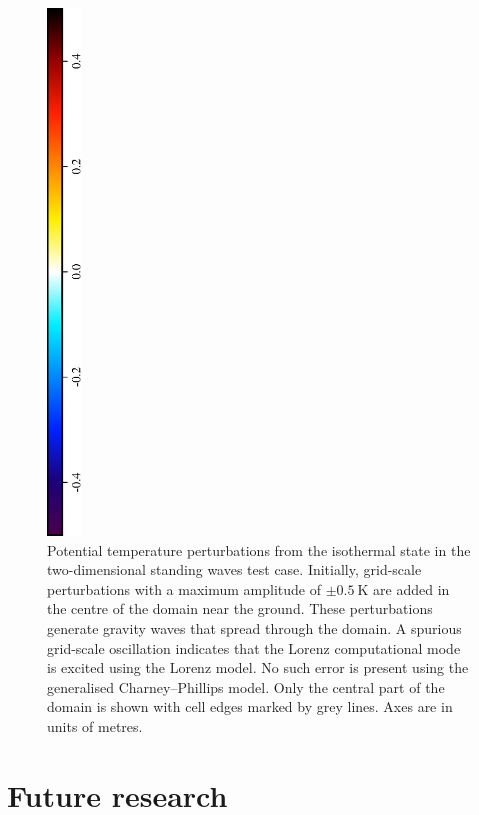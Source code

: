 \documentclass[a4paper,11pt]{article}
\begin{document}
\begin{figure}
\includegraphics[height=5.5in,angle=270]{theta-diff-legend.eps}
\caption{Potential temperature perturbations from the isothermal state in the two-dimensional standing waves test case.  Initially, grid-scale perturbations with a maximum amplitude of $\pm \SI{0.5}{\kelvin}$ are added in the centre of the domain near the ground.  These perturbations generate gravity waves that spread through the domain.  A spurious grid-scale oscillation indicates that the Lorenz computational mode is excited using the Lorenz model.  No such error is present using the generalised Charney--Phillips model.
Only the central part of the domain is shown with cell edges marked by grey lines.
Axes are in units of metres.
}
\label{fig:cp-results}
\end{figure}

\section{Future research}

\end{document}

